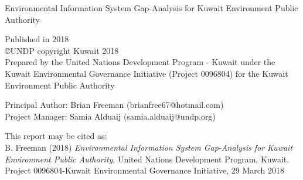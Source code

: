 Environmental Information System Gap-Analysis for Kuwait Environment Public Authority

\vspace*{.02\textheight}

Published in 2018\\
\copyright UNDP copyright Kuwait 2018\\
Prepared by the United Nations Development Program - Kuwait under the Kuwait Environmental Governance Initiative (Project 0096804) for the Kuwait Environment Public Authority\\

\vspace*{.02\textheight}

Principal Author: Brian Freeman (brianfree67@hotmail.com)\\
Project Manager: Samia Alduaij (samia.alduaij@undp.org)

\vspace*{.02\textheight}

This report may be cited as: \\
B. Freeman (2018) \textit{Environmental Information System Gap-Analysis for Kuwait Environment Public Authority}, United Nations Development Program, Kuwait. Project 0096804-Kuwait Environmental Governance Initiative, 29 March 2018